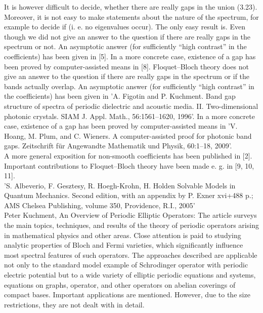 It is however difficult to decide, whether there are really gaps in the union (3.23). Moreover, it is not easy to make statements about the nature of the spectrum, for example to decide if (i. e. no eigenvalues occur). The only easy result is.	 Even though we did not give an answer to the question if there are really gaps in the spectrum or not. An asymptotic answer (for sufficiently “high contrast” in the coefficients) has been given in [5]. In a more concrete case, existence of a gap has been proved by computer-assisted means in [8]. Floquet–Bloch theory does not give an answer to the question if there are really gaps in the spectrum or if the bands actually overlap. An asymptotic answer (for sufficiently “high contrast” in the coefficients) has been given in 'A. Figotin and P. Kuchment. Band gap structure of spectra of periodic dielectric and acoustic media. II. Two-dimensional photonic crystals. SIAM J. Appl. Math., 56:1561–1620, 1996'. In a more concrete case, existence of a gap has been proved by computer-assisted means in 'V. Hoang, M. Plum, and C. Wieners. A computer-assisted proof for photonic band gaps. Zeitschrift für Angewandte Mathematik und Physik, 60:1–18, 2009'.
~\\
A more general exposition for non-smooth coefficients has been published in [2]. Important contributions to Floquet–Bloch theory have been made e. g. in [9, 10, 11].	
~\\
'S. Albeverio, F. Gesztesy, R. Hoegh-Krohn, H. Holden Solvable Models in Quantum Mechanics. Second edition, with an appendix by P. Exner xvi+488 p.; AMS Chelsea Publishing, volume 350, Providence, R.I., 2005'
~\\
Peter Kuchment, An Overview of Periodic Elliptic Operators: The article surveys the main topics, techniques, and results of the theory of periodic operators arising in mathematical physics and other areas. Close attention is paid to studying analytic properties of Bloch and Fermi varieties, which significantly influence most spectral features of such operators. The approaches described are applicable not only to the standard model example of Schrodinger operator with periodic electric potential but to a wide variety of elliptic periodic equations and systems, equations on graphs, operator, and other operators on abelian coverings of compact bases. Important applications are mentioned. However, due to the size restrictions, they are not dealt with in detail.
~\\
